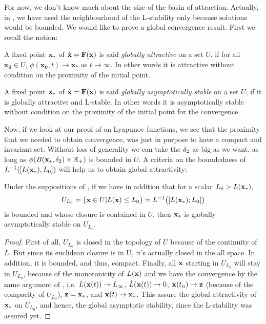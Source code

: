 For now, we don't know much about the size of the basin of attraction. Actually, in , we have used the neighbourhood of the L-stability only because solutions would be bounded. We would like to prove a global convergence result. First we recall the notion: 
\begin{definition}
    A fixed point $\mathbf{x}_*$ of $\dot{\mathbf{x}}=\mathbf{F}(\mathbf{x})$ is said \emph{globally attractive} on a set $U$, if for all $\mathbf{x_0}\in U$, $\phi(\mathbf{x_0},t) \to \mathbf{x}_*$ as $t \to\infty$. In other words it is attractive without condition on the proximity of the initial point.
\end{definition}
\begin{definition}
    A fixed point $\mathbf{x}_*$ of $\dot{\mathbf{x}}=\mathbf{F}(\mathbf{x})$ is said \emph{globally asymptotically stable} on a set $U$, if it is globally attractive and L-stable. In other words it is asymptotically stable without condition on the proximity of the initial point for the convergence.
\end{definition}
Now, if we look at our proof of  on Lyapunov functions, we see that the proximity that we needed to obtain convergence, was just in purpose to have a compact and invariant set. Without loss of generality we can take the $\delta_2$ as big as we want, as long as $\phi(B(\mathbf{x}_*,\delta_2)\times\mathbb{R}_+)$ is bounded in $U$. A criteria on the boundedness of $L^{-1}([L(\mathbf{x}_*),L_0])$ will help us to obtain global attractivity:
\begin{corollaire}
Under the suppositions of , if we have in addition that for a scalar $L_0>L(\mathbf{x}_*)$,
\[ U_{L_0} = \{ \mathbf{x}\in U | L(\mathbf{x}) \leq L_0\} = L^{-1}\big([L(\mathbf{x}_*);L_0]\big) \]
is bounded and whose closure is contained in $U$, then $\mathbf{x}_*$ is globally asymptotically stable on $U_{L_0}$.
\end{corollaire}
\begin{proof}
First of all, $U_{L_0}$ is closed in the topology of $U$ because of the continuity of $L$. But since its euclidean closure is in U, it's actually closed in the all space. In addition, it is bounded, and thus, compact. Finally, all $\mathbf{x}$ starting in $U_{L_0}$ will stay in $U_{L_0}$, because of the monotonicity of $L(\mathbf{x})$ and we have the convergence by the same argument of , i.e. $L(\mathbf{x}(t))\to L_\infty$, $\dot{L}(\mathbf{x}(t))\to 0$, $\mathbf{x}(t_n)\to \mathbf{z}$ (because of the compacity of $U_{L_0}$), $\mathbf{z}=\mathbf{x}_*$, and $\mathbf{x}(t)\to \mathbf{x}_*$. This assure the global attractivity of $\mathbf{x}_*$ on $U_{L_0}$, and hence, the global asymptotic stability, since the L-stability was assured yet.
\end{proof}

